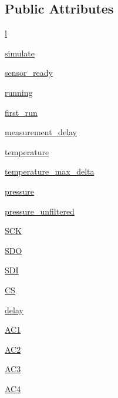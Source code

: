 \subsection*{Public Attributes}
\begin{DoxyCompactItemize}
\item 
\hyperlink{classbmp183_1_1bmp183_ac87bb026ca991eff94a53cf63aa86e88}{l}
\item 
\hyperlink{classbmp183_1_1bmp183_af2e228fbb767e51461bc3b906c95e08a}{simulate}
\item 
\hyperlink{classbmp183_1_1bmp183_a1d2933cf8ce9bbd7abf24bb1f28ab4ee}{sensor\+\_\+ready}
\item 
\hyperlink{classbmp183_1_1bmp183_a4838c002f7a24208181603b7a7971153}{running}
\item 
\hyperlink{classbmp183_1_1bmp183_a5f1d5197f3919e316f43334abbf79445}{first\+\_\+run}
\item 
\hyperlink{classbmp183_1_1bmp183_aaca2ad4c3eba2c305cbd3f971d85dcc2}{measurement\+\_\+delay}
\item 
\hyperlink{classbmp183_1_1bmp183_a272d8d0103d7e896ec2e5ab9b5d9bf68}{temperature}
\item 
\hyperlink{classbmp183_1_1bmp183_ab5582d76691ab9fd6a6ae580be6db9a9}{temperature\+\_\+max\+\_\+delta}
\item 
\hyperlink{classbmp183_1_1bmp183_aa47a54b94ef26b77e7d0e139f9417871}{pressure}
\item 
\hyperlink{classbmp183_1_1bmp183_a1b8e100aed6d3a6f3cfeb92b66a60af1}{pressure\+\_\+unfiltered}
\item 
\hyperlink{classbmp183_1_1bmp183_a0d61f8d98e702bd5a9dd1f5f5a09727c}{S\+CK}
\item 
\hyperlink{classbmp183_1_1bmp183_a6c1a17425e5f0a326f71017871ae3414}{S\+DO}
\item 
\hyperlink{classbmp183_1_1bmp183_aa659c8f1c1a30c0c165fe3f76b2ad5f2}{S\+DI}
\item 
\hyperlink{classbmp183_1_1bmp183_a359725ee2f7c74747e696f9798edb73a}{CS}
\item 
\hyperlink{classbmp183_1_1bmp183_a35cbcb30fbc22936680ab2f007f08c89}{delay}
\item 
\hyperlink{classbmp183_1_1bmp183_a82d67582b79b80d138db18a07fb5d351}{A\+C1}
\item 
\hyperlink{classbmp183_1_1bmp183_a85de00ba5a69ec2aef7d3b425d690671}{A\+C2}
\item 
\hyperlink{classbmp183_1_1bmp183_a9975c3c482a0e3b428f7f425f3e5c461}{A\+C3}
\item 
\hyperlink{classbmp183_1_1bmp183_ab4d3b53ffef90a7d3cfc7f60d2704265}{A\+C4}

\end{DoxyCompactItemize}
